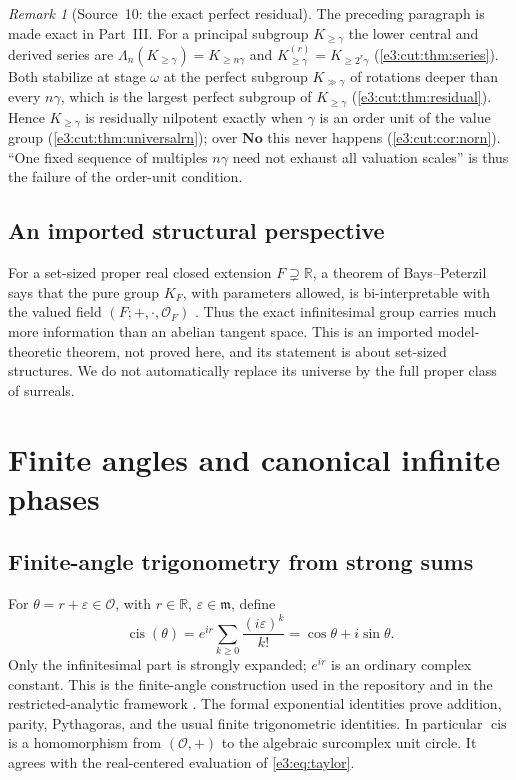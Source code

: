 \documentclass[11pt,letterpaper]{article}
\numberwithin{equation}{section}
\theoremstyle{definition}
\theoremstyle{remark}
\newtheorem{remark}[remark]{Remark}
\newcommand{\No}{\mathbf{No}}
\newcommand{\R}{\mathbb R}
\newcommand{\OO}{\mathcal O}
\newcommand{\mm}{\mathfrak m}
\newcommand{\eps}{\varepsilon}
\newcommand{\cis}{\operatorname{cis}}
\begin{document}
\begin{remark}[Source~10: the exact perfect residual]\label{e3:cut:rem:residualforward}
The preceding paragraph is made exact in Part~III. For a principal subgroup
$K_{\ge\gamma}$ the lower central and derived series are
$\Lambda_n(K_{\ge\gamma})=K_{\ge n\gamma}$ and
$K_{\ge\gamma}^{(r)}=K_{\ge2^r\gamma}$ (\cref{e3:cut:thm:series}). Both stabilize
at stage $\omega$ at the perfect subgroup $K_{\gg\gamma}$ of rotations deeper than
every $n\gamma$, which is the largest perfect subgroup of $K_{\ge\gamma}$
(\cref{e3:cut:thm:residual}). Hence $K_{\ge\gamma}$ is residually nilpotent
exactly when $\gamma$ is an order unit of the value group
(\cref{e3:cut:thm:universalrn}); over $\No$ this never happens
(\cref{e3:cut:cor:norn}). ``One fixed sequence of multiples $n\gamma$ need not
exhaust all valuation scales'' is thus the failure of the order-unit condition.
\end{remark}

\subsection{An imported structural perspective}

For a set-sized proper real closed extension \(F\supsetneq\R\), a theorem of
Bays--Peterzil says that the pure group \(K_F\), with parameters allowed, is
bi-interpretable with the valued field \((F;+,{\cdot},\OO_F)\)
\cite[Theorem 1.1 and Remark 1.2]{BP}. Thus the exact infinitesimal group carries
much more information than an abelian tangent space. This is an imported
model-theoretic theorem, not proved here, and its statement is about set-sized
structures. We do not automatically replace its universe by the full proper
class of surreals.

\section{Finite angles and canonical infinite phases}\label{e3:so:sec:angles}

\subsection{Finite-angle trigonometry from strong sums}

For \(\theta=r+\eps\in\OO\), with \(r\in\R\), \(\eps\in\mm\), define
\begin{equation}\label{e3:so:eq:finitephase}
 \cis(\theta)=e^{ir}\sum_{k\ge0}\frac{(i\eps)^k}{k!}
 =\cos\theta+i\sin\theta.
\end{equation}
Only the infinitesimal part is strongly expanded; \(e^{ir}\) is an ordinary
complex constant. This is the finite-angle construction used in the repository
\cite{RepoTrig} and in the restricted-analytic framework \cite{EK}.
The formal exponential identities prove addition, parity, Pythagoras, and the
usual finite trigonometric identities. In particular \(\cis\) is a
homomorphism from \((\OO,+)\) to the algebraic surcomplex unit circle. It
agrees with the real-centered evaluation of \cref{e3:eq:taylor}.
\end{document}
